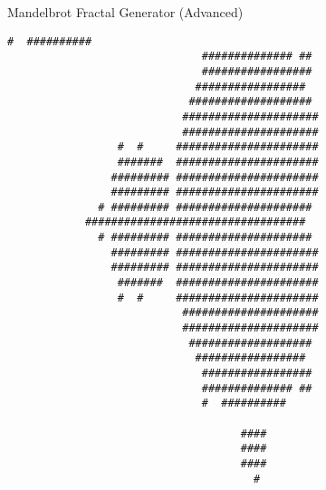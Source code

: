 \documentclass{lab}
\begin{document}
\begin{task}{Mandelbrot Fractal Generator (Advanced)}{}
\begin{lstlisting}[style=pseudo,basicstyle=\ttfamily\tiny]
                              #  ##########                                      
                              ############## ##                                  
                              #################                                  
                             #################                                   
                            ###################                                  
                           #####################                                 
                           #####################                                 
                 #  #     ######################                                 
                 #######  ######################                                 
                ######### ######################                                 
                ######### ######################                                 
              # ######### #####################                                  
            ##################################                                   
              # ######### #####################                                  
                ######### ######################                                 
                ######### ######################                                 
                 #######  ######################                                 
                 #  #     ######################                                 
                           #####################                                 
                           #####################                                 
                            ###################                                  
                             #################                                   
                              #################                                  
                              ############## ##                                  
                              #  ##########                                      
                                                                                 
                                    ####                                         
                                    ####                                         
                                    ####                                         
                                      #                                          
                                                                                 
                                                                                 
\end{lstlisting}
\end{task}
\end{document}
